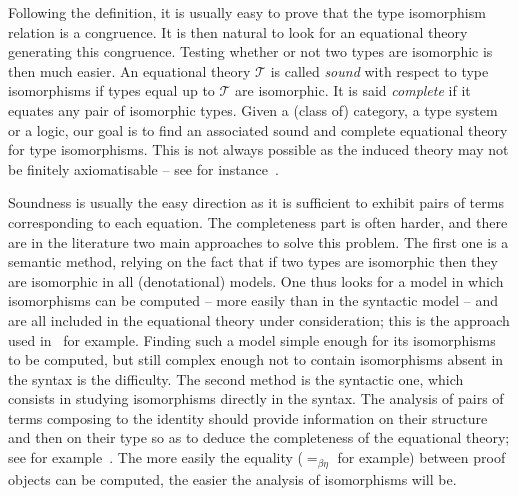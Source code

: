 \documentclass{lmcs}
\newcommand*{\eqeq}{=} %
\newcommand{\eqbn}{\mathrel{\eqeq_{\beta\eta}}}
\begin{document}
Following the definition, it is usually easy to prove that the type isomorphism relation is a congruence.
It is then natural to look for an equational theory generating this congruence.
Testing whether or not two types are isomorphic is then much easier.
An equational theory $\mathcal{T}$ is called \emph{sound} with respect to type isomorphisms if types equal up to $\mathcal{T}$ are isomorphic.
It is said \emph{complete} if it equates any pair of isomorphic types.
Given a (class of) category, a type system or a logic, our goal is to find an associated sound and complete equational theory for type isomorphisms.
This is not always possible as the induced theory may not be finitely axiomatisable -- see for instance~\cite{isosum}.

Soundness is usually the easy direction as it is sufficient to exhibit pairs of terms corresponding to each equation.
The completeness part is often harder, and there are in the literature two main approaches to solve this problem.
The first one is a semantic method, relying on the fact that if two types are isomorphic then they are isomorphic in all (denotational) models.
One thus looks for a model in which isomorphisms can be computed -- more easily than in the syntactic model -- and are all included in the equational theory under consideration; this is the approach used in~\cite{isosoloviev,classisos} for example.
Finding such a model simple enough for its isomorphisms to be computed, but still complex enough not to contain isomorphisms absent in the syntax is the difficulty.
The second method is the syntactic one, which consists in studying isomorphisms directly in the syntax.
The analysis of pairs of terms composing to the identity should provide information on their structure and then on their type so as to deduce the completeness of the equational theory; see for example~\cite{isotypes,mllisos}.
The more easily the equality ($\eqbn$ for example) between proof objects can be computed, the easier the analysis of isomorphisms will be.
\end{document}

